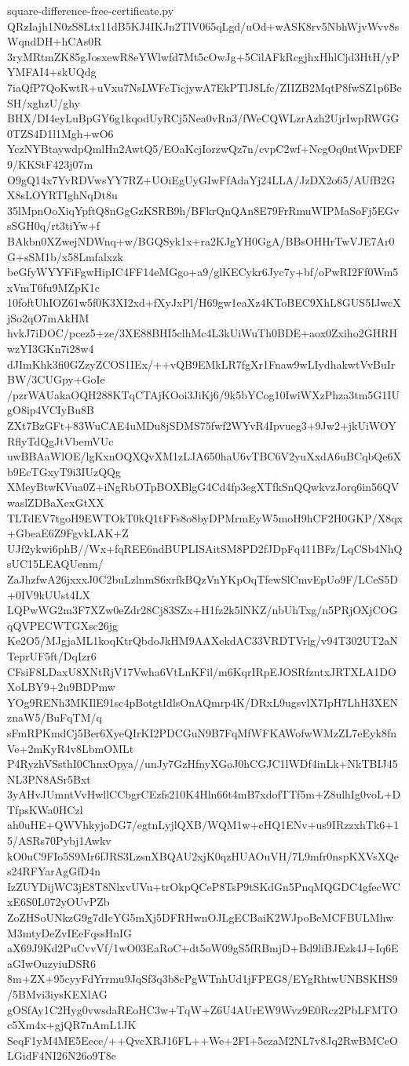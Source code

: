 \documentclass[11pt]{article}
\theoremstyle{definition}
\theoremstyle{remark}
\begin{document}
\begin{filecontents*}[overwrite]{square-difference-free-certificate.py}
QRzIajh1N0zS8Ltx11dB5KJ4IKJn2TlV065qLgd/uOd+wASK8rv5NbhWjvWvv8sWqndDH+hCAs0R
3ryMRtmZK85gJosxewR8eYWlwfd7Mt5cOwJg+5CilAFkRcgjhxHhlCjd3HtH/yPYMFAI4+skUQdg
7iaQfP7QoKwtR+uVxu7NsLWFcTicjywA7EkPTlJ8Lfc/ZIIZB2MqtP8fwSZ1p6BeSH/xghzU/ghy
BHX/DI4eyLuBpGY6g1kqodUyRCj5Nea0vRn3/fWeCQWLzrAzh2UjrIwpRWGG0TZS4D1l1Mgh+wO6
YczNYBtaywdpQmlHn2AwtQ5/EOaKcjIorzwQz7n/cvpC2wf+NcgOq0ntWpvDEF9/KKStF423j07m
O9gQ14x7YvRDVwsYY7RZ+UOiEgUyGIwFfAdaYj24LLA/JzDX2o65/AUfB2GX8sLOYRTIghNqDt8u
35lMpnOoXiqYpftQ8nGgGzKSRB9h/BFkrQnQAn8E79FrRmuWIPMaSoFj5EGvsSGH0q/rt3tiYw+f
BAkbn0XZwejNDWnq+w/BGQSyk1x+ra2KJgYH0GgA/BBsOHHrTwVJE7Ar0G+sSM1b/x58Lmfalxzk
beGfyWYYFiFgwHipIC4FF14eMGgo+a9/glKECykr6Jyc7y+bf/oPwRI2Ff0Wm5xVmT6fu9MZpK1c
10foftUhIOZ61w5f0K3XI2xd+fXyJxPl/H69gw1eaXz4KToBEC9XhL8GUS5IJwcXjSo2qO7mAkHM
hvkJ7iDOC/pcez5+ze/3XE88BHI5clhMc4L3kUiWuTh0BDE+aox0Zxiho2GHRHwzYI3GKn7i28w4
dJImKhk3fi0GZzyZCOS1IEx/++vQB9EMkLR7fgXr1Fnaw9wLIydhakwtVvBuIrBW/3CUGpy+GoIe
/pzrWAUakaOQH288KTqCTAjKOoi3JiKj6/9k5bYCog10IwiWXzPhza3tm5G1IUgO8ip4VCIyBu8B
ZXt7BzGFt+83WuCAE4uMDu8jSDMS75fwf2WYvR4Ipvueg3+9Jw2+jkUiWOYRflyTdQgJtVbemVUc
uwBBAaWlOE/lgKxnOQXQvXM1zLJA650haU6vTBC6V2yuXxdA6uBCqbQe6Xb9EcTGxyT9i3IUzQQg
XMeyBtwKVua0Z+iNgRbOTpBOXBlgG4Cd4fp3egXTfkSnQQwkvzJorq6in56QVwaslZDBaXexGtXX
TLTdEV7tgoH9EWTOkT0kQ1tFFs8o8byDPMrmEyW5moH9hCF2H0GKP/X8qx+GbeaE6Z9FgvkLAK+Z
UJf2ykwi6phB//Wx+fqREE6ndBUPLISAitSM8PD2fJDpFq411BFz/LqCSb4NhQsUC15LEAQUenm/
ZaJhzfwA26jxxxJ0C2buLzlnmS6xrfkBQzVnYKpOqTfewSlCmvEpUo9F/LCeS5D+0IV9kUUst4LX
LQPwWG2m3F7XZw0eZdr28Cj83SZx+H1fz2k5lNKZ/nbUhTxg/n5PRjOXjCOGqQVPECWTGXsc26jg
Ke2O5/MJgjaML1koqKtrQbdoJkHM9AAXekdAC33VRDTVrlg/v94T302UT2aNTeprUF5ft/DqIzr6
CFsiF8LDaxU8XNtRjV17Vwha6VtLnKFil/m6KqrIRpEJOSRfzntxJRTXLA1DOXoLBY9+2u9BDPmw
YOg9RENh3MKIlE91sc4pBotgtIdlsOnAQmrp4K/DRxL9ugsvlX7IpH7LhH3XENznaW5/BuFqTM/q
sFmRPKmdCj5Ber6XyeQIrKI2PDCGuN9B7FqMfWFKAWofwWMzZL7eEyk8fnVe+2mKyR4v8LbmOMLt
P4RyzhVSsthI0ChnxOpya//unJy7GzHfnyXGoJ0hCGJC1lWDf4inLk+NkTBIJ45NL3PN8ASr5Bxt
3yAHvJUmntVvHwllCCbgrCEzfs210K4Hln66t4mB7xdofTTf5m+Z8ulhIg0voL+DTfpsKWa0HCzl
ah0uHE+QWVhkyjoDG7/egtnLyjlQXB/WQM1w+cHQ1ENv+us9IRzzxhTk6+15/ASRs70Pybj1Awkv
kO0uC9FIo5S9Mr6fJRS3LzsnXBQAU2xjK0qzHUAOuVH/7L9mfr0nspKXVsXQes24RFYarAgGfD4n
IzZUYDijWC3jE8T8NlxvUVu+trOkpQCeP8TsP9tSKdGn5PnqMQGDC4gfecWCxE6S0L072yOUvPZb
ZoZHSoUNkzG9g7dIcYG5mXj5DFRHwnOJLgECBaiK2WJpoBeMCFBULMhwM3mtyDeZvIEeFqssHnIG
aX69J9Kd2PuCvvVf/1wO03EaRoC+dt5oW09gS5fRBmjD+Bd9liBJEzk4J+Iq6EaGIwOuzyiuDSR6
8m+ZX+95cyyFdYrrmu9JqSf3q3b8cPgWTnhUd1jFPEG8/EYgRhtwUNBSKHS9/5BMvi3iysKEXlAG
gOSfAy1C2Hyg0vwsdaREoHC3w+TqW+Z6U4AUrEW9Wvz9E0Rcz2PbLFMTOc5Xm4x+gjQR7nAmL1JK
SeqF1yM4ME5Eece/++QvcXRJ16FL++We+2FI+5ezaM2NL7v8Jq2RwBMCeOLGidF4NI26N26o9T8e

\end{filecontents*}
\end{document}
